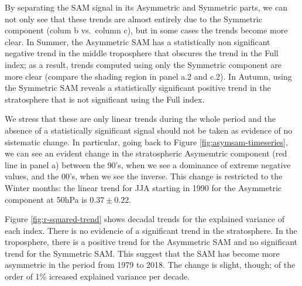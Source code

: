 \documentclass[]{ametsocV5}
\begin{document}
By separating the SAM signal in its Asymmetric and Symmetric parts, we
can not only see that these trends are almost entirely due to the
Symmetric component (colum b vs.~column c), but in some cases the trends
become more clear. In Summer, the Asymmetric SAM has a statistically non
significant negative trend in the middle troposphere that obscures the
trend in the Full index; as a result, trends computed using only the
Symmetric component are more clear (compare the shading region in panel
a.2 and c.2). In Autumn, using the Symmetric SAM reveals a statistically
significant positive trend in the stratosphere that is not significant
using the Full index.

We stress that these are only linear trends during the whole period and
the absence of a statistically significant signal should not be taken as
evidence of no sistematic change. In particular, going back to Figure
\ref{fig:asymsam-timeseries}, we can see an evident change in the
stratospheric Asymemtric component (red line in panel a) between the
90's, when we see a dominance of extreme negative values, and the 00's,
when we see the inverse. This change is restricted to the Winter months:
the linear trend for JJA starting in 1990 for the Asymmetric component
at 50hPa is \(0.37 \pm 0.22\).

Figure \ref{fig:r-squared-trend} shows decadal trends for the explained
variance of each index. There is no evidencie of a significant trend in
the stratosphere. In the troposphere, there is a positive trend for the
Asymmetric SAM and no significant trend for the Symmetric SAM. This
suggest that the SAM has become more asymmetric in the period from 1979
to 2018. The change is slight, though; of the order of 1\% icreased
explained variance per decade.
\end{document}
